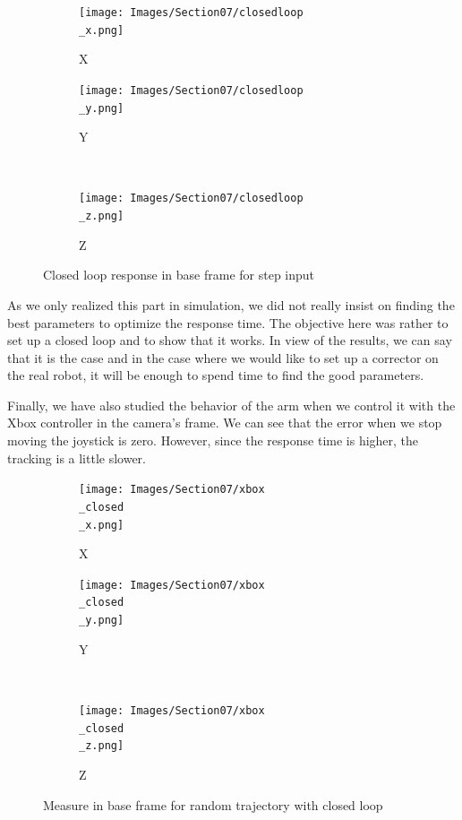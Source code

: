 \begin{figure}[H]
    \begin{subfigure}{.5\linewidth}
        \centering
        \texttt{[image: Images/Section07/closedloop\\\_x.png]}
        \caption{X}
        \label{fig:ClosedX}
    \end{subfigure}%
    \begin{subfigure}{.5\linewidth}
        \centering
        \texttt{[image: Images/Section07/closedloop\\\_y.png]}
        \caption{Y}
        \label{fig:ClosedY}
    \end{subfigure}\\[1ex]
    \begin{subfigure}{\linewidth}
        \centering
        \texttt{[image: Images/Section07/closedloop\\\_z.png]}
        \caption{Z}
        \label{fig:ClosedZ}
        \end{subfigure}
        \caption{Closed loop response in base frame for step input}
        \label{fig:ClosedLoopGraph}
\end{figure}
\FloatBarrier
As we only realized this part in simulation, we did not really insist on finding the best parameters to optimize the response time. The objective here was rather to set up a closed loop and to show that it works. In view of the results, we can say that it is the case and in the case where we would like to set up a corrector on the real robot, it will be enough to spend time to find the good parameters.

\bigbreak
Finally, we have also studied the behavior of the arm when we control it with the Xbox controller in the camera's frame. We can see that the error when we stop moving the joystick is zero. However, since the response time is higher, the tracking is a little slower.
\begin{figure}[H]
    \begin{subfigure}{.5\linewidth}
        \centering
        \texttt{[image: Images/Section07/xbox\\\_closed\\\_x.png]}
        \caption{X}
        \label{fig:XboxtrajClosedX}
    \end{subfigure}%
    \begin{subfigure}{.5\linewidth}
        \centering
        \texttt{[image: Images/Section07/xbox\\\_closed\\\_y.png]}
        \caption{Y}
        \label{fig:XboxtrajClosedY}
    \end{subfigure}\\[1ex]
    \begin{subfigure}{\linewidth}
        \centering
        \texttt{[image: Images/Section07/xbox\\\_closed\\\_z.png]}
        \caption{Z}
        \label{fig:XboxtrajClosedZ}
        \end{subfigure}
        \caption{Measure in base frame for random trajectory with closed loop}
        \label{fig:XboxtrajClosed}
\end{figure}
\FloatBarrier